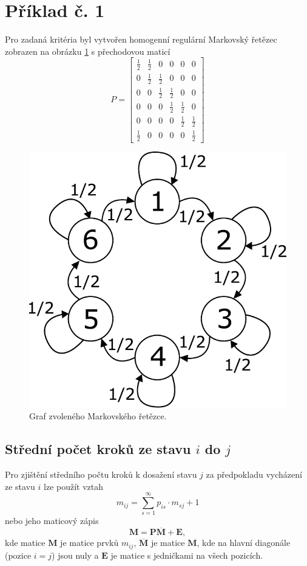 \documentclass{article}
\begin{document}
	
	
	
	
	\section{Příklad č. 1}
		Pro zadaná kritéria byl vytvořen homogenní regulární Markovský řetězec zobrazen na obrázku \ref{pic:markovsky_retezec_obr} s přechodovou maticí
		\[P = \begin{bmatrix}
			\frac{1}{2}&\frac{1}{2}&0&0&0&0\\
			0&\frac{1}{2}&\frac{1}{2}&0&0&0\\
			0&0&\frac{1}{2}&\frac{1}{2}&0&0\\
			0&0&0&\frac{1}{2}&\frac{1}{2}&0\\
			0&0&0&0&\frac{1}{2}&\frac{1}{2}\\
			\frac{1}{2}&0&0&0&0&\frac{1}{2}
		\end{bmatrix}\]
			\begin{figure}[H]
				\centering
				\includegraphics[width=.5\textwidth]{./Graphics/priklad_01.pdf}
				\caption{Graf zvoleného Markovského řetězce.}
				\label{pic:markovsky_retezec_obr}
			\end{figure}
		\subsection{Střední počet kroků ze stavu \(i\) do \(j\)}
			Pro zjištění středního počtu kroků k dosažení stavu \(j\) za předpokladu vycházení ze stavu \(i\) lze použít vztah \[m_{ij}=\sum_{s=1}^{\infty}p_{is}\cdot m_{sj}+1\] nebo jeho maticový zápis \[\mathbf{M}=\mathbf{P}\overline{\mathbf{M}}+\mathbf{E},\]kde matice \(\mathbf{M}\) je matice prvků \(m_{ij}\), \(\overline{\mathbf{M}}\) je matice \(\mathbf{M}\), kde na hlavní diagonále (pozice \(i=j\)) jsou nuly a \(\mathbf{E}\) je matice s jedničkami na všech pozicích.\\
			
\end{document}
